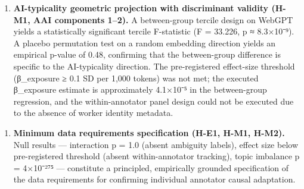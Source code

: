 \begin{enumerate}
\item \textbf{AI-typicality geometric projection with discriminant validity (H-M1, AAI components 1–2).} A between-group tercile design on WebGPT yields a statistically significant tercile F-statistic (F = 33.226, p ≈ 8.3×10⁻⁹). A placebo permutation test on a random embedding direction yields an empirical p-value of 0.48, confirming that the between-group difference is specific to the AI-typicality direction. The pre-registered effect-size threshold (β_exposure ≥ 0.1 SD per 1,000 tokens) was not met; the executed β_exposure estimate is approximately 4.1×10⁻⁵ in the between-group regression, and the within-annotator panel design could not be executed due to the absence of worker identity metadata.
\end{enumerate}

\begin{enumerate}
\item \textbf{Minimum data requirements specification (H-E1, H-M1, H-M2).} Null results — interaction p = 1.0 (absent ambiguity labels), effect size below pre-registered threshold (absent within-annotator tracking), topic imbalance p = 4×10⁻²⁷⁵ — constitute a principled, empirically grounded specification of the data requirements for confirming individual annotator causal adaptation.
\end{enumerate}

